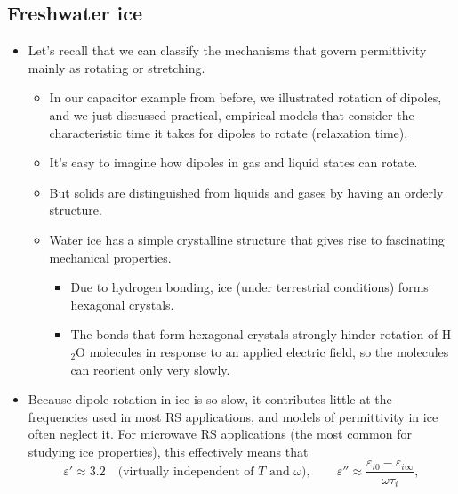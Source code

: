 \documentclass[11pt, oneside]{article}
\begin{document}
\subsection{Freshwater ice}

\begin{itemize}
	\item Let's recall that we can classify the mechanisms that govern permittivity mainly as rotating or stretching.
	\begin{itemize}
		\item In our capacitor example from before, we illustrated rotation of dipoles, and we just discussed practical, empirical models that consider the characteristic time it takes for dipoles to rotate (relaxation time).
		\item It's easy to imagine how dipoles in gas and liquid states can rotate.
		\item But solids are distinguished from liquids and gases by having an orderly structure.
		\item Water ice has a simple crystalline structure that gives rise to fascinating mechanical properties.
		\begin{itemize}
			\item Due to hydrogen bonding, ice (under terrestrial conditions) forms hexagonal crystals.
			\item The bonds that form hexagonal crystals strongly hinder rotation of H$_2$O molecules in response to an applied electric field, so the molecules can reorient only very slowly.
		\end{itemize}
	\end{itemize}
	\item Because dipole rotation in ice is so slow, it contributes little at the frequencies used in most RS applications, and models of permittivity in ice often neglect it. For microwave RS applications (the most common for studying ice properties), this effectively means that
	\begin{equation}
		\varepsilon' \approx 3.2 \quad \text{(virtually independent of $T$ and $\omega$)},
		\qquad
		\varepsilon'' \approx \frac{\varepsilon_{i0} - \varepsilon_{i\infty}}{\omega\tau_i},

\end{equation}
\end{itemize}
\end{document}
